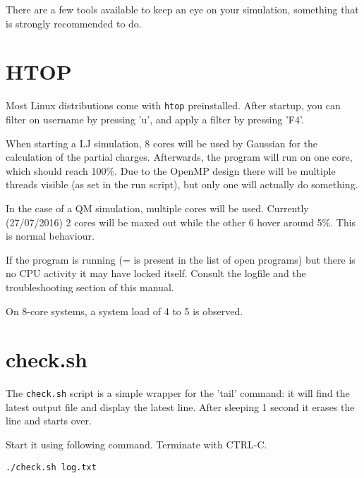 
There are a few tools available to keep an eye on your simulation, something 
that is strongly recommended to do.


\section{HTOP}
Most Linux distributions come with \verb|htop| preinstalled. After startup, you 
can filter on username by pressing 'u', and apply a filter by pressing 'F4'. 

When starting a LJ simulation, 8 cores will be used by Gaussian for the 
calculation of the partial charges. Afterwards, the program will run on one 
core, which should reach 100\%. Due to the OpenMP design there will be multiple 
threads visible (as set in the run script), but only one will actually do 
something.

In the case of a QM simulation, multiple cores will be used. Currently 
(27/07/2016) 2 cores will be maxed out while the other 6 hover around 5\%. This 
is normal behaviour.

If the program is running (= is present in the list of open programs) but there 
is no CPU activity it may have locked itself. Consult the logfile and the 
troubleshooting section of this manual.

On 8-core systems, a system load of 4 to 5 is observed.

\section{check.sh}
The \verb|check.sh| script is a simple wrapper for the 'tail' command: it will 
find the latest output file and display the latest line. After sleeping 1 
second it erases the line and starts over.

Start it using following command. Terminate with CTRL-C.
\begin{lstlisting}[caption=The check utility]
./check.sh log.txt
\end{lstlisting}